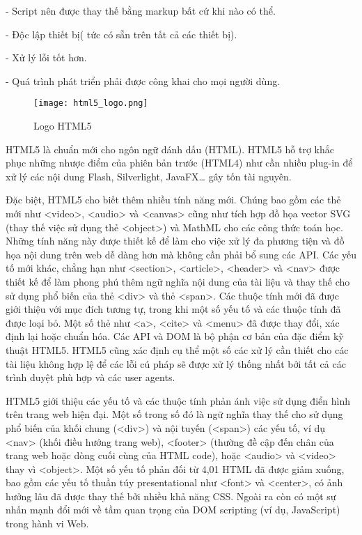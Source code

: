 \quad - Script nên được thay thế bằng markup bất cứ khi nào có thể.

\quad - Độc lập thiết bị( tức có sẵn trên tất cả các thiết bị).

\quad - Xử lý lỗi tốt hơn.

\quad - Quá trình phát triển phải được công khai cho mọi người dùng.

\begin{figure}[!h] 
\centering
\texttt{[image: html5\_logo.png]}
\caption{Logo HTML5}
\end{figure}

HTML5 là chuẩn mới cho ngôn ngữ đánh dấu (HTML). HTML5 hỗ trợ khắc phục những nhược điểm của phiên bản trước (HTML4) như cần nhiều plug-in để xử lý các nội dung Flash, Silverlight, JavaFX… gây tốn tài nguyên.

Đặc biệt, HTML5 cho biết thêm nhiều tính năng mới. Chúng bao gồm các thẻ mới như <video>, <audio> và <canvas> cũng như tích hợp đồ họa vector SVG (thay thế việc sử dụng thẻ <object>) và MathML cho các công thức toán học. Những tính năng này được thiết kế để làm cho việc xử lý đa phương tiện và đồ họa nội dung trên web dễ dàng hơn mà không cần phải bổ sung các API. Các yếu tố mới khác, chẳng hạn như <section>, <article>, <header> và <nav> được thiết kế để làm phong phú thêm ngữ nghĩa nội dung của tài liệu và thay thế cho sử dụng phổ biến của thẻ <div> và thẻ <span>. Các thuộc tính mới đã được giới thiệu với mục đích tương tự, trong khi một số yếu tố và các thuộc tính đã được loại bỏ. Một số thẻ như <a>, <cite> và <menu> đã được thay đổi, xác định lại hoặc chuẩn hóa. Các API và DOM là bộ phận cơ bản của đặc điểm kỹ thuật HTML5. HTML5 cũng xác định cụ thể một số các xử lý cần thiết cho các tài liệu không hợp lệ để các lỗi cú pháp sẽ được xử lý thống nhất bởi tất cả các trình duyệt phù hợp và các user agents.

HTML5 giới thiệu các yếu tố và các thuộc tính phản ánh việc sử dụng điển hình trên trang web hiện đại. Một số trong số đó là ngữ nghĩa thay thế cho sử dụng phổ biến của khối chung (<div>) và nội tuyến (<span>) các yếu tố, ví dụ <nav> (khối điều hướng trang web), <footer> (thường đề cập đến chân của trang web hoặc dòng cuối cùng của HTML code), hoặc <audio> và <video> thay vì <object>. Một số yếu tố phản đối từ 4,01 HTML đã được giảm xuống, bao gồm các yếu tố thuần túy presentational như <font> và <center>, có ảnh hưởng lâu đã được thay thế bởi nhiều khả năng CSS. Ngoài ra còn có một sự nhấn mạnh đổi mới về tầm quan trọng của DOM scripting (ví dụ, JavaScript) trong hành vi Web.

